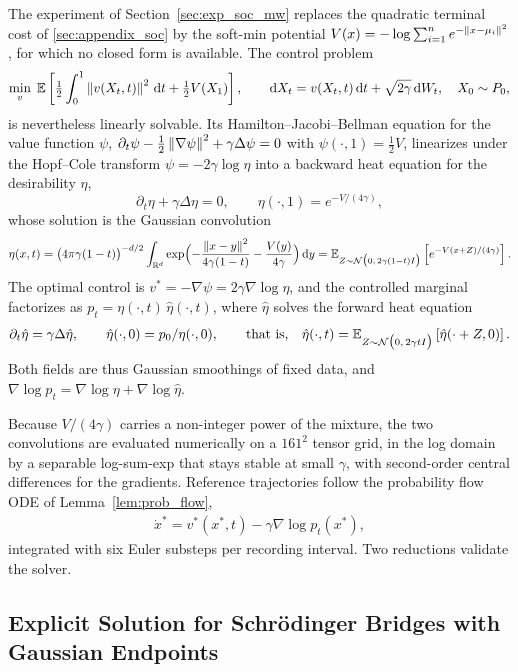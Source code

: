 \documentclass[preprint]{elsarticle}
\newcommand{\rd}{\mathrm{d}}
\newcommand{\dd}{\,\mathrm{d}}          \newcommand{\pdv}[2]{\dfrac{\partial #1}{\partial #2}}
\newcommand{\R}{\mathbb{R}}
\newcommand{\E}{\mathbb{E}}
\newcommand{\g}{\gamma}
\newcommand{\m}{\mu}
\newcommand{\sN}{\mathcal{N}}
\begin{document}
The experiment of Section~\ref{sec:exp_soc_mw} replaces the quadratic terminal cost of \ref{sec:appendix_soc} by the soft-min potential \(V(x)=-\log\sum_{i=1}^{n}e^{-\norm{x-\m_i}^2}\), for which no closed form is available. The control problem
\[
\min_v\;
\E\left[\tfrac12\int_0^1\norm{v(X_t,t)}^2\dd t+\tfrac12 V(X_1)\right],
\qquad
\rd X_t=v(X_t,t)\,\rd t+\sqrt{2\g}\,\rd W_t,
\quad X_0\sim P_0,
\]
is nevertheless linearly solvable. Its Hamilton--Jacobi--Bellman equation for the value function $\psi$, $\partial_t\psi-\tfrac12\norm{\nabla\psi}^2+\g\Delta\psi=0$ with $\psi(\cdot,1)=\tfrac12 V$, linearizes under the Hopf--Cole transform $\psi=-2\g\log\eta$ \cite{fleming2006controlled,kappen2005linear} into a backward heat equation for
the desirability $\eta$,
\[
\partial_t\eta+\g\Delta\eta=0,
\qquad
\eta(\cdot,1)=e^{-V/(4\g)},
\]
whose solution is the Gaussian convolution
\begin{align}
\eta(x,t)
=
\qb{4\pi\g(1-t)}^{-d/2}
\int_{\R^d}
\exp\qB{-\frac{\norm{x-y}^2}{4\g(1-t)}-\frac{V(y)}{4\g}}\dd y
=
\E_{Z\sim\sN\qb{0,\,2\g(1-t)I}}\left[e^{-V(x+Z)/(4\g)}\right].
\label{equ:hopfcole_eta}
\end{align}
The optimal control is $v^*=-\nabla\psi=2\g\nabla\log\eta$, and the controlled marginal factorizes as $p_t=\eta(\cdot,t)\,\hat\eta(\cdot,t)$, where $\hat\eta$ solves the forward heat equation~\cite{daipra1991stochastic,chen2021liaisons}
\[
\partial_t\hat\eta=\g\Delta\hat\eta,
\qquad
\hat\eta(\cdot,0)=p_0/\eta(\cdot,0),
\qquad\text{that is,}\quad
\hat\eta(\cdot,t)=\E_{Z\sim\sN\qb{0,\,2\g t I}}\left[\hat\eta(\cdot+Z,0)\right].
\]
Both fields are thus Gaussian smoothings of fixed data, and $\nabla\log p_t=\nabla\log\eta+\nabla\log\hat\eta$.

Because $V/(4\g)$ carries a non-integer power of the mixture, the two convolutions are evaluated numerically on a $161^2$ tensor grid, in the log domain by a separable log-sum-exp that stays stable at small $\g$, with second-order central differences for the gradients. Reference trajectories follow the probability flow ODE of Lemma~\ref{lem:prob_flow},
\begin{align}
\dot x^*=v^*(x^*,t)-\g\nabla\log p_t(x^*),
\label{equ:hopfcole_pfode}
\end{align}
integrated with six Euler substeps per recording interval. Two reductions validate the solver.


\subsection{Explicit Solution for Schr\"odinger Bridges with Gaussian Endpoints}
\label{sec:appendix_sb}
\end{document}
